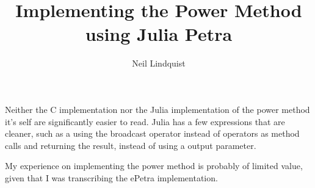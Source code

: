 \documentclass{article}
\title{Implementing the Power Method using Julia Petra}
\author{Neil Lindquist}
\begin{document}
	
Neither the C implementation nor the Julia implementation of the power method it's self are significantly easier to read.
Julia has a few expressions that are cleaner, such as a using the broadcast operator instead of
operators as method calls and returning the result, instead of using a output parameter.

My experience on implementing the power method is probably of limited value, given that I was transcribing the ePetra
implementation.
\end{document}
